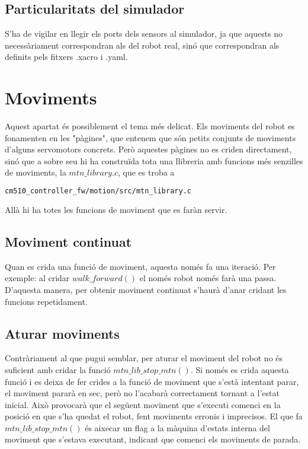 \documentclass{article}
\begin{document}
\subsection{Particularitats del simulador}
S'ha de vigilar en llegir els ports dels sensors al simulador, ja que aquests no necessàriament correspondran als del robot real, sinó que correspondran als definits pels fitxers .xacro i .yaml.



\section{Moviments}
Aquest apartat és possiblement el tema més delicat. Els moviments del robot es fonamenten en les "pàgines", que entenem que són petits conjunts de moviments d'alguns servomotors concrets. Però aquestes pàgines no es criden directament, sinó que a sobre seu hi ha construïda tota una llibreria amb funcions més senzilles de moviments, la $mtn\_library.c$, que es troba a 
\begin{lstlisting}[language=bash]
cm510_controller_fw/motion/src/mtn_library.c
\end{lstlisting}
Allà hi ha totes les funcions de moviment que es faràn servir. 

\subsection{Moviment continuat}
Quan es crida una funció de moviment, aquesta només fa una iteració. Per exemple: al cridar $walk\_forward()$ el només robot només farà una passa. D'aquesta manera, per obtenir moviment continuat s'haurà d'anar cridant les funcions repetidament. 

\subsection{Aturar moviments}
Contràriament al que pugui semblar, per aturar el moviment del robot no és suficient amb cridar la funció $mtn\_lib\_stop\_mtn()$. Si només es crida aquesta funció i es deixa de fer crides a la funció de moviment que s'està intentant parar, el moviment pararà en sec, però no l'acabarà correctament tornant a l'estat inicial. Això provocarà que el següent moviment que s'executi comenci en la posició en que s'ha quedat el robot, fent moviments erronis i imprecisos. El que fa $mtn\_lib\_stop\_mtn()$ és aixecar un flag a la màquina d'estats interna del moviment que s'estava executant, indicant que comenci els moviments de parada. 
\end{document}

